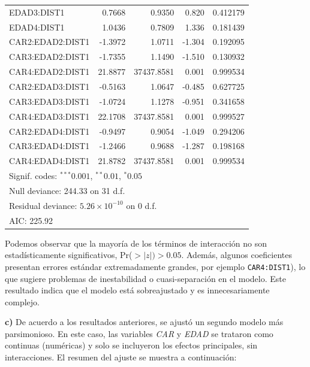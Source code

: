 \begin{table}[H]
\begin{tabular}{lrrrr}
EDAD3:DIST1        & 0.7668  & 0.9350 & 0.820  & 0.412179 \\
EDAD4:DIST1        & 1.0436  & 0.7809 & 1.336  & 0.181439 \\
CAR2:EDAD2:DIST1   & -1.3972 & 1.0711 & -1.304 & 0.192095 \\
CAR3:EDAD2:DIST1   & -1.7355 & 1.1490 & -1.510 & 0.130932 \\
CAR4:EDAD2:DIST1   & 21.8877 & 37437.8581& 0.001  & 0.999534 \\
CAR2:EDAD3:DIST1   & -0.5163 & 1.0647 & -0.485 & 0.627725 \\
CAR3:EDAD3:DIST1   & -1.0724 & 1.1278 & -0.951 & 0.341658 \\
CAR4:EDAD3:DIST1   & 22.1708 & 37437.8581& 0.001  & 0.999527 \\
CAR2:EDAD4:DIST1   & -0.9497 & 0.9054 & -1.049 & 0.294206 \\
CAR3:EDAD4:DIST1   & -1.2466 & 0.9688 & -1.287 & 0.198168 \\
CAR4:EDAD4:DIST1   & 21.8782 & 37437.8581& 0.001  & 0.999534 \\
\midrule
\multicolumn{5}{l}{\footnotesize Signif. codes: $^{***}0.001$, $^{**}0.01$, $^{*}0.05$} \\
\multicolumn{5}{l}{\footnotesize Null deviance: 244.33 on 31 d.f.} \\
\multicolumn{5}{l}{\footnotesize Residual deviance: $5.26 \times 10^{-10}$ on 0 d.f.} \\
\multicolumn{5}{l}{\footnotesize AIC: 225.92} \\
\end{tabular}
\end{table}

Podemos observar que la mayoría de los términos de interacción no son estadísticamente significativos,  Pr($>|z|) > 0.05$. Además, algunos coeficientes presentan errores estándar extremadamente grandes, por ejemplo \texttt{CAR4:DIST1}), lo que sugiere problemas de inestabilidad o cuasi-separación en el modelo. Este resultado indica que el modelo está sobreajustado y es innecesariamente complejo.

\newpage
\textbf{c)} De acuerdo a los resultados anteriores, se ajustó un segundo modelo más parsimonioso. En este caso, las variables \textit{CAR} y \textit{EDAD} se trataron como continuas (numéricas) y solo se incluyeron los efectos principales, sin interacciones. El resumen del ajuste se muestra a continuación:

